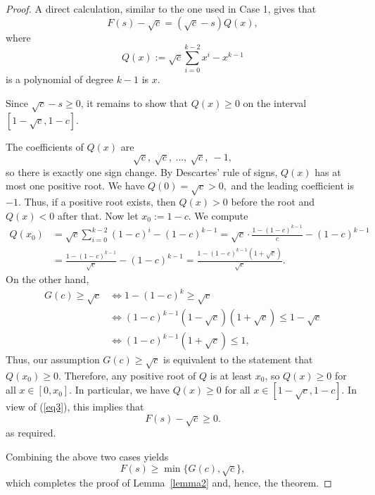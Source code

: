 \documentclass[10pt,a4paper]{amsart}
\begin{document}
\begin{proof}

A direct calculation, similar to the one used in Case 1, gives that
\begin{equation}\label{eq3}
F(s)-\sqrt c=(\sqrt c-s)Q(x),
\end{equation}
where
\[
Q(x):=\sqrt{c}\sum_{i=0}^{k-2}x^i-x^{k-1}
\]
is a polynomial of degree $k-1$ is $x$.

Since $\sqrt{c}-s\ge 0$, it remains to show that $Q(x)\ge 0$ on the interval $[1-\sqrt{c},1-c]$.

The coefficients of $Q(x)$ are
\[
\sqrt{c},\ \sqrt{c},\ \dots,\ \sqrt{c},\ -1,
\]
so there is exactly one sign change.
By Descartes' rule of signs, $Q(x)$ has at most one positive root.
We have
$Q(0)=\sqrt{c}>0,$
and the leading coefficient is $-1$. Thus, if a positive root exists, then $Q(x)>0$ before the root and $Q(x)<0$ after that.
Now let $x_0:=1-c.$
We compute
\begin{align*}
Q(x_0)
&=\sqrt{c}\sum_{i=0}^{k-2}(1-c)^i-(1-c)^{k-1}=\sqrt{c}\cdot \frac{1-(1-c)^{k-1}}{c}-(1-c)^{k-1} \\
&=\frac{1-(1-c)^{k-1}}{\sqrt{c}}-(1-c)^{k-1}=\frac{1-(1-c)^{k-1}(1+\sqrt{c})}{\sqrt{c}}.
\end{align*}
On the other hand,
\begin{align*}
G(c)\ge \sqrt{c}
&\iff 1-(1-c)^k\ge \sqrt{c} \\
&\iff (1-c)^{k-1}(1-\sqrt{c})(1+\sqrt{c})\le 1-\sqrt{c} \\
&\iff (1-c)^{k-1}(1+\sqrt{c})\le 1,
\end{align*}
Thus, our assumption $G(c)\ge \sqrt{c}$ is equivalent to the statement that
$Q(x_0)\ge 0.$
Therefore, any positive root of $Q$ is at least $x_0$, so $Q(x)\ge 0$ for all $x\in[0,x_0]$.
In particular, we have $Q(x)\ge 0$ for all $x\in[1-\sqrt{c},1-c]$. In view of (\ref{eq3}), this implies that
\[
F(s)-\sqrt{c}\ge 0.
\]
as required.
\medskip

Combining the above two cases yields
\[
F(s)\ge \min\{G(c),\sqrt c\},
\]
which completes the proof of Lemma~\ref{lemma2} and, hence, the theorem.
\end{proof}
\end{document}
